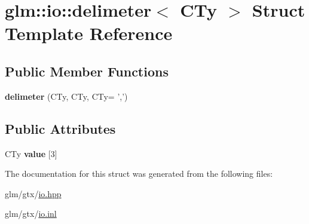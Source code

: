 \hypertarget{structglm_1_1io_1_1delimeter}{\section{glm\-:\-:io\-:\-:delimeter$<$ C\-Ty $>$ Struct Template Reference}
\label{structglm_1_1io_1_1delimeter}
}
\subsection*{Public Member Functions}
\begin{DoxyCompactItemize}
\item 
\hypertarget{structglm_1_1io_1_1delimeter_acd4b6e1e816d423a069688c4772b9500}{{\bfseries delimeter} (C\-Ty, C\-Ty, C\-Ty= ',')}\label{structglm_1_1io_1_1delimeter_acd4b6e1e816d423a069688c4772b9500}

\end{DoxyCompactItemize}
\subsection*{Public Attributes}
\begin{DoxyCompactItemize}
\item 
\hypertarget{structglm_1_1io_1_1delimeter_a9ade129dae50c4f716f724e7425f9c68}{C\-Ty {\bfseries value} \mbox{[}3\mbox{]}}\label{structglm_1_1io_1_1delimeter_a9ade129dae50c4f716f724e7425f9c68}

\end{DoxyCompactItemize}


The documentation for this struct was generated from the following files\-:\begin{DoxyCompactItemize}
\item 
glm/gtx/\hyperlink{io_8hpp}{io.\-hpp}\item 
glm/gtx/\hyperlink{io_8inl}{io.\-inl}\end{DoxyCompactItemize}
